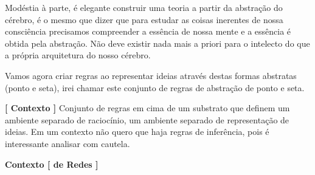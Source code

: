\documentclass[10pt,a4paper]{report}
\begin{document}
\hspace{\baselineskip}

Modéstia à parte, é elegante construir uma teoria a partir da abstração do cérebro, é o mesmo que dizer que para estudar as coisas inerentes de nossa consciência precisamos compreender a essência de nossa mente e a essência é obtida pela abstração. Não deve existir nada mais a priori para o intelecto do que a própria arquitetura do nosso cérebro.

\hspace{\baselineskip}

Vamos agora criar regras ao representar ideias através destas formas abstratas (ponto e seta), irei chamar este conjunto de regras de abstração de ponto e seta.

\hspace{\baselineskip}

\textbf{[ Contexto ]} Conjunto de regras em cima de um substrato que definem um ambiente separado de raciocínio, um ambiente separado de representação de ideias. Em um contexto não quero que haja regras de inferência, pois é interessante analisar com cautela.

\hspace{\baselineskip}

\textbf{Contexto [ de Redes ]}
\end{document}
